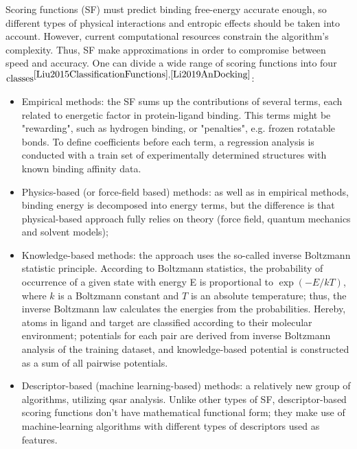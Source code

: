   Scoring functions (SF) must predict binding free-energy accurate enough, so different types of physical interactions and entropic effects should be taken into account.
  However, current computational resources constrain the algorithm's complexity.
  Thus, SF make approximations in order to compromise between speed and accuracy. One can divide a wide range of scoring functions into four $\text{classes}^{\cite{Liu2015ClassificationFunctions}, \cite{Li2019AnDocking}}$:
  \begin{itemize}
        \item Empirical methods: the SF sums up the contributions of several terms, each related to energetic factor in protein-ligand binding.
        This terms might be "rewarding", such as hydrogen binding, or "penalties", e.g. frozen rotatable bonds.
        To define coefficients before each term, a regression analysis is conducted with a train set of experimentally determined structures with known binding affinity data.
       \item Physics-based (or force-field based) methods: as well as in empirical methods, binding energy is decomposed into energy terms, but the difference is that physical-based approach fully relies on theory (force field, quantum mechanics and solvent models);
      \item Knowledge-based methods: the approach uses the so-called inverse Boltzmann statistic principle.
      According to Boltzmann statistics, the probability of occurrence of a given state with energy E is proportional to $\exp{(-E/kT)}$, where $k$ is a Boltzmann constant and $T$ is an absolute temperature; thus, the inverse Boltzmann law calculates the energies from the probabilities.
      Hereby, atoms in ligand and target are classified according to their molecular environment; potentials for each pair are derived from inverse Boltzmann analysis of the training dataset, and knowledge-based potential is constructed as a sum of all pairwise potentials.
      \item Descriptor-based (machine learning-based) methods: a relatively new group of algorithms, utilizing \acrshort{qsar} analysis.
      Unlike other types of SF, descriptor-based scoring functions don't have mathematical functional form; they make use of machine-learning algorithms with different types of descriptors used as features. 
  \end{itemize}

